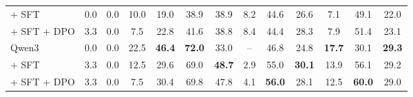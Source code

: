 \begin{table}[ht]
\begin{tabular}{lcccccccccccc}
\quad + SFT & 0.0 & 0.0 & 10.0 & 19.0 & 38.9 & 38.9 & 8.2 & 44.6 & 26.6 & 7.1 & 49.1 & 22.0 \\
\quad + SFT + DPO & 3.3 & 0.0 & 7.5 & 22.8 & 41.6 & 38.8 & 8.4 & 44.4 & 28.3 & 7.9 & 51.4 & 23.1 \\
\midrule
\addlinespace[0.3em]
Qwen3 & 0.0 & 0.0 & 22.5 & \textbf{46.4} & \textbf{72.0} & 33.0 & -- & 46.8 & 24.8 & \textbf{17.7} & 30.1 & \textbf{29.3} \\
\quad + SFT & 3.3 & 0.0 & 12.5 & 29.6 & 69.0 & \textbf{48.7} & 2.9 & 55.0 & \textbf{30.1} & 13.9 & 56.1 & 29.2 \\
\quad + SFT + DPO & 3.3 & 0.0 & 7.5 & 30.4 & 69.8 & 47.8 & 4.1 & \textbf{56.0} & 28.1 & 12.5 & \textbf{60.0} & 29.0 \\
\bottomrule
\end{tabular}
\end{table}


